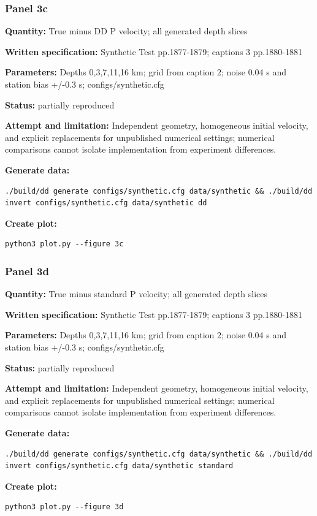 \subsubsection*{Panel 3c}
\noindent\textbf{Quantity:} True minus DD P velocity; all generated depth slices\par
\noindent\textbf{Written specification:} Synthetic Test pp.1877-1879; captions 3 pp.1880-1881\par
\noindent\textbf{Parameters:} Depths 0,3,7,11,16 km; grid from caption 2; noise 0.04 s and station bias +/-0.3 s; configs/synthetic.cfg\par
\noindent\textbf{Status:} partially reproduced\par
\noindent\textbf{Attempt and limitation:} Independent geometry, homogeneous initial velocity, and explicit replacements for unpublished numerical settings; numerical comparisons cannot isolate implementation from experiment differences.\par
\noindent\textbf{Generate data:}
\begin{lstlisting}
./build/dd generate configs/synthetic.cfg data/synthetic && ./build/dd invert configs/synthetic.cfg data/synthetic dd
\end{lstlisting}
\noindent\textbf{Create plot:}
\begin{lstlisting}
python3 plot.py --figure 3c
\end{lstlisting}
\subsubsection*{Panel 3d}
\noindent\textbf{Quantity:} True minus standard P velocity; all generated depth slices\par
\noindent\textbf{Written specification:} Synthetic Test pp.1877-1879; captions 3 pp.1880-1881\par
\noindent\textbf{Parameters:} Depths 0,3,7,11,16 km; grid from caption 2; noise 0.04 s and station bias +/-0.3 s; configs/synthetic.cfg\par
\noindent\textbf{Status:} partially reproduced\par
\noindent\textbf{Attempt and limitation:} Independent geometry, homogeneous initial velocity, and explicit replacements for unpublished numerical settings; numerical comparisons cannot isolate implementation from experiment differences.\par
\noindent\textbf{Generate data:}
\begin{lstlisting}
./build/dd generate configs/synthetic.cfg data/synthetic && ./build/dd invert configs/synthetic.cfg data/synthetic standard
\end{lstlisting}
\noindent\textbf{Create plot:}
\begin{lstlisting}
python3 plot.py --figure 3d
\end{lstlisting}
